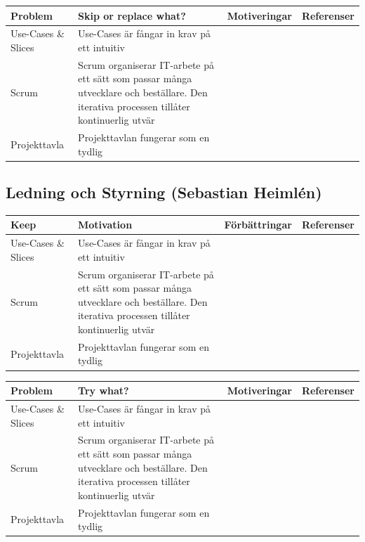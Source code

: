 \documentclass[conference,a4paper]{IEEEtran}
\newcommand\Tstrut{\rule{0pt}{2.6ex}}       %
\newcommand\Bstrut{\rule[-0.9ex]{0pt}{0pt}} %
\newcommand{\TBstrut}{\Tstrut\Bstrut} %
\begin{document}
\begin{table}[H]
	\small
  \centering
	\begin{tabular}{|p{1.5cm}|p{2cm}|p{1.8cm}|p{1.5cm}|} %
    \hline
    Problem & Skip or replace what? & Motiveringar & Referenser \TBstrut \\
    \hline
    Use-Cases \& Slices & Use-Cases är fångar in krav på ett intuitiv & & \TBstrut \\
    \hline
    Scrum & Scrum organiserar IT-arbete på ett sätt som passar många utvecklare och beställare. Den iterativa processen tillåter kontinuerlig utvär & & \TBstrut \\
    \hline
    Projekttavla & Projekttavlan fungerar som en tydlig & & \TBstrut \\
    \hline
  \end{tabular}
\end{table}

\subsection{Ledning och Styrning (Sebastian Heimlén)}
\begin{table}[H]
	\small
  \centering
	\begin{tabular}{|p{1.5cm}|p{2cm}|p{1.8cm}|p{1.5cm}|} %
    \hline
    Keep & Motivation & Förbättringar & Referenser \TBstrut \\
    \hline
    Use-Cases \& Slices & Use-Cases är fångar in krav på ett intuitiv & & \TBstrut \\
    \hline
    Scrum & Scrum organiserar IT-arbete på ett sätt som passar många utvecklare och beställare. Den iterativa processen tillåter kontinuerlig utvär & & \TBstrut \\
    \hline
    Projekttavla & Projekttavlan fungerar som en tydlig & & \TBstrut \\
    \hline
  \end{tabular}
\end{table}

\begin{table}[H]
	\small
  \centering
	\begin{tabular}{|p{1.5cm}|p{2cm}|p{1.8cm}|p{1.5cm}|} %
    \hline
    Problem & Try what? & Motiveringar & Referenser \TBstrut \\
    \hline
    Use-Cases \& Slices & Use-Cases är fångar in krav på ett intuitiv & & \TBstrut \\
    \hline
    Scrum & Scrum organiserar IT-arbete på ett sätt som passar många utvecklare och beställare. Den iterativa processen tillåter kontinuerlig utvär & & \TBstrut \\
    \hline
    Projekttavla & Projekttavlan fungerar som en tydlig & & \TBstrut \\
    \hline
  \end{tabular}
\end{table}
\end{document}
